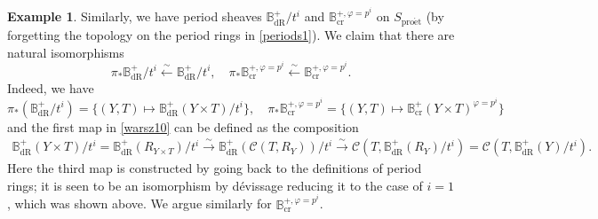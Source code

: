\documentclass[10pt]{amsart}
\theoremstyle{definition}
\newtheorem{example}[equation]{Example}
\theoremstyle{remark}
\def\phi{\varphi}
\newcommand{\dr}{\operatorname{dR} }
\newcommand{\proeet}{\operatorname{pro\acute{e}t} }
\newcommand{\crr}{\operatorname{cr} }
\newcommand{\scc}{{\mathcal{C}}}
\numberwithin{equation}{section}
\numberwithin{equation}{section}
\begin{document}
\begin{example}
 Similarly, we have period sheaves $\mathbb{B}^+_{\dr}/t^i$ and $\mathbb{B}^{+,\phi=p^i}_{\crr}$ on $S_{\proeet}$ (by forgetting the topology on the period rings in \eqref{periods1}). We claim that there are natural isomorphisms
\begin{equation}\label{warsz10}
\pi_*\mathbb{B}^+_{\dr}/t^i\stackrel{\sim}{\leftarrow}\mathbb{B}^+_{\dr}/t^i, \quad \pi_*\mathbb{B}^{+,\phi=p^i}_{\crr}\stackrel{\sim}{\leftarrow}\mathbb{B}^{+,\phi=p^i}_{\crr}.
 \end{equation}
 Indeed, we have 
 $$
 \pi_*(\mathbb{B}^+_{\dr}/t^i)=\{(Y,T)\mapsto \mathbb{B}^+_{\dr}(Y\times T)/t^i\}, \quad \pi_*\mathbb{B}^{+,\phi=p^i}_{\crr}
 =\{(Y,T)\mapsto \mathbb{B}^+_{\crr}(Y\times T)^{\phi=p^i}\}
 $$
 and the first map in \eqref{warsz10} can be defined as the composition
 \begin{align*}
  \mathbb{B}^+_{\dr}(Y\times T)/t^i =  \mathbb{B}^+_{\dr}(R_{Y\times T})/t^i \stackrel{\sim}{\to}\mathbb{B}^+_{\dr}(\scc(T, R_Y))/t^i\stackrel{\sim}{\to} \scc(T,  \mathbb{B}^+_{\dr}( R_Y)/t^i)=\scc(T,  \mathbb{B}^+_{\dr}(Y)/t^i).
 \end{align*}
 Here  the third map  is constructed by  going back to the definitions of  period rings; it is seen to be an isomorphism by d\'evissage reducing it to the case of $i=1$, which was shown above. We argue 
  similarly for $\mathbb{B}^{+,\phi=p^i}_{\crr}$.
  \end{example}
\end{document}
